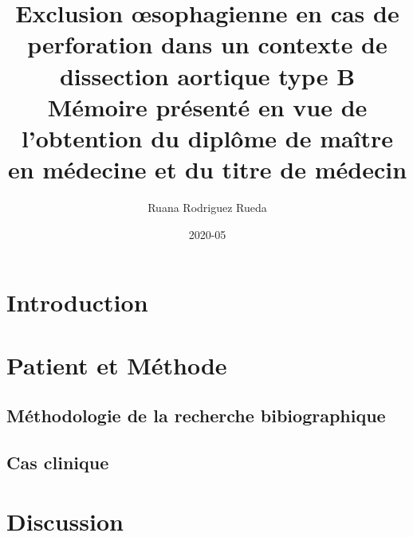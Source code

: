 \documentclass{article}
\title{
{Exclusion œsophagienne en cas de perforation dans un contexte de dissection aortique type B}\\
\large Mémoire présenté en vue de l'obtention du diplôme de maître en médecine et du titre de médecin}
\author{Ruana Rodriguez Rueda}
\date{2020-05}
\begin{document}


\section{Introduction}
    

\section{Patient et Méthode}

    \subsection{Méthodologie de la recherche bibiographique}
        

    \subsection{Cas clinique}
        

\section{Discussion}
    

\newpage

\printbibliography
\end{document}
